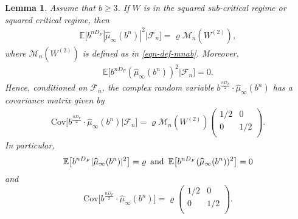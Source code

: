 \documentclass[12pt]{amsart}
\newtheorem{lemma}[theorem]{Lemma}
\theoremstyle{definition}
\theoremstyle{remark}
\newcommand{\E}{\mathbb{E}}
\newcommand{\MAB}{\mathscr{M}_{n}(W^{(2)})}
\newcommand{\an}{\text{\, and \,}}
\numberwithin{equation}{section}
\begin{document}
\begin{lemma}\label{lemma-mean-zero-s}
Assume that $b \ge 3$. If  $W$ is in the squared sub-critical regime or squared critical regime, then 
\begin{align}\label{eqn-A-equal-0}
\E\Big[ b^{n D_F}|\widehat{\mu}_{\infty}(b^n)|^2 \big| \mathscr{F}_{n}\Big] =\varrho\MAB, 
\end{align}
where $\MAB$ is  defined as in \eqref{eqn-def-mnab}.  Moreover,  
\begin{align}\label{eqn-A-mo-equal-0}
\E\Big[b^{n D_F}(\widehat{\mu}_{\infty}(b^n))^2 \big| \mathscr{F}_{n}\Big] =0.
\end{align}
 Hence, conditioned on $\mathscr{F}_{n}$,   the complex random variable $b^{\frac{n D_F}{2}}\cdot \widehat{\mu}_{\infty}(b^n)$ has a covariance matrix given by 
\begin{align}\label{eqn-cov-conditional}
\mathrm{Cov}\Big[b^{\frac{n D_F}{2}}\cdot \widehat{\mu}_{\infty}(b^n)\big| \mathscr{F}_{n}\Big]=\varrho\MAB
\begin{pmatrix}
1/2&0\\
0&1/2\\
\end{pmatrix}.
\end{align}
In particular, 
\begin{align}\label{eqn-b-power-n-rho}
\E\big[b^{ n D_F}|\widehat{\mu}_{\infty}(b^n)|^2 \big] =\varrho \an \E\big[ b^{n D_F}(\widehat{\mu}_{\infty}(b^n))^2 \big] =0
\end{align}
and
\[
\mathrm{Cov}\big[b^{\frac{n D_F}{2}}\cdot \widehat{\mu}_{\infty}(b^n)\big]= \varrho \begin{pmatrix}
1/2&0\\
0&1/2\\
\end{pmatrix}.
\]
\end{lemma}
\end{document}
